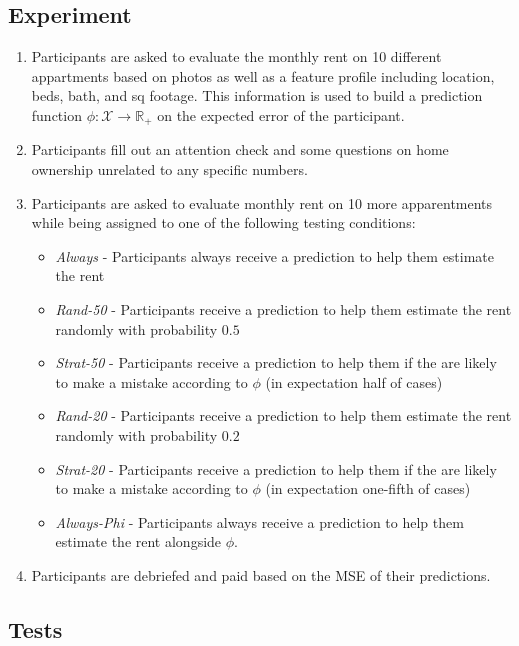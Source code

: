 \documentclass[10pt]{article}
\newcommand{\X}{\mathcal{X}}
\begin{document}
\subsection*{Experiment}

\begin{enumerate}
	\item Participants are asked to evaluate the monthly rent on 10 different appartments based on photos as well as a feature profile including location, beds, bath, and sq footage. This information is used to build a prediction function $\phi:\X \to \mathbb{R}_+$ on the expected error of the participant. 
	\item Participants fill out an attention check and some questions on home ownership unrelated to any specific numbers.
	\item Participants are asked to evaluate monthly rent on 10 more apparentments while being assigned to one of the following testing conditions:
	\begin{itemize}
		\item \textit{Always} - Participants always receive a prediction to help them estimate the rent
		\item \textit{Rand-50} - Participants receive a prediction to help them estimate the rent randomly with probability $0.5$
		\item \textit{Strat-50} - Participants receive a prediction to help them if the are likely to make a mistake according to $\phi$ (in expectation half of cases)
		\item \textit{Rand-20} - Participants receive a prediction to help them estimate the rent randomly with probability $0.2$
		\item \textit{Strat-20} - Participants receive a prediction to help them if the are likely to make a mistake according to $\phi$ (in expectation one-fifth of cases)
		\item \textit{Always-Phi} - Participants always receive a prediction to help them estimate the rent alongside $\phi$.
	\end{itemize}
	\item Participants are debriefed and paid based on the MSE of their predictions.
\end{enumerate}

\subsection*{Tests}
\end{document}

